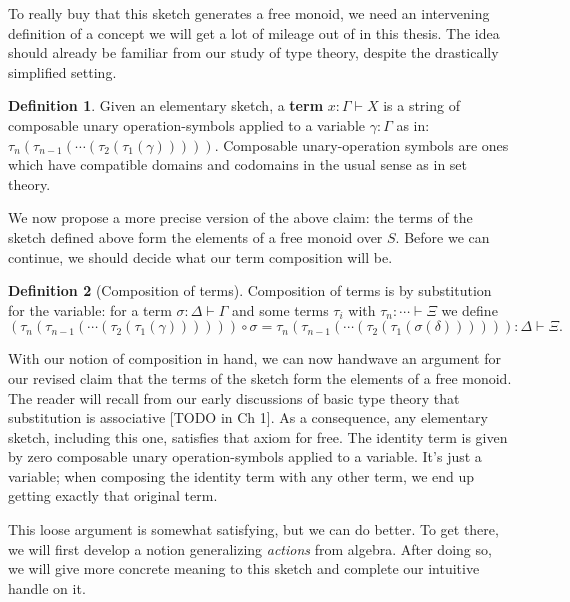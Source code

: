 \documentclass[12pt,twoside]{reedthesis}
\theoremstyle{definition}
\newtheorem{definition}{Definition}
\theoremstyle{remark}
\theoremstyle{plain}
\begin{document}
To really buy that this sketch generates a free monoid, we need an intervening
definition of a concept we will get a lot of mileage out of in this thesis. The
idea should already be familiar from our study of type theory, despite the
drastically simplified setting.

\begin{definition}\label{def:term}
  Given an elementary sketch, a \textbf{term} $x : \Gamma \vdash X$ is a string of
  composable unary operation-symbols applied to a variable $\gamma : \Gamma$ as in:
  \( \tau_{n} (\tau_{n-1} (\cdots (\tau_{2}(\tau_{1}(\gamma))))) \). Composable unary-operation
  symbols are ones which have compatible domains and codomains in the usual
  sense as in set theory.
\end{definition}

We now propose a more precise version of the above claim: the terms of the
sketch defined above form the elements of a free monoid over $S$. Before we can
continue, we should decide what our term composition will be.

\begin{definition}[Composition of terms]\label{def:term composition}
  Composition of terms is by substitution for the variable: for a term
  \( \sigma : \Delta \vdash \Gamma\) and some terms \( \tau_{i}\) with \( \tau_{n} : \cdots \vdash \Xi \) we define
  \[ (\tau_{n} (\tau_{n-1} (\cdots (\tau_{2}(\tau_{1}(\gamma)))))) \circ \sigma = \tau_{n} (\tau_{n-1} (\cdots (\tau_{2}(\tau_{1}(\sigma(\delta)))))) : \Delta \vdash \Xi. \]
\end{definition}

With our notion of composition in hand, we can now handwave an argument for our
revised claim that the terms of the sketch form the elements of a free monoid.
The reader will recall from our early discussions of basic type theory that
substitution is associative [TODO in Ch 1]. As a consequence, any elementary
sketch, including this one, satisfies that axiom for free. The identity term is
given by zero composable unary operation-symbols applied to a variable. It's
just a variable; when composing the identity term with any other term, we end up
getting exactly that original term.

This loose argument is somewhat satisfying, but we can do better. To get there,
we will first develop a notion generalizing \emph{actions} from algebra. After
doing so, we will give more concrete meaning to this sketch and complete our
intuitive handle on it.
\end{document}
